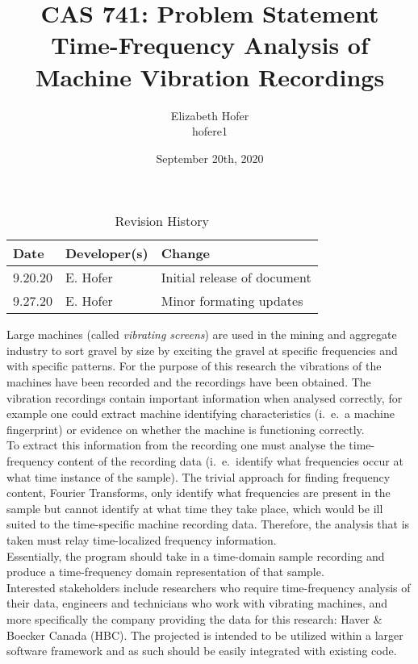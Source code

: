 \documentclass{article}
\title{CAS 741: Problem Statement\\Time-Frequency Analysis of Machine Vibration Recordings}
\author{Elizabeth Hofer \\ hofere1}
\date{September 20th, 2020}
\begin{document}
\maketitle

\begin{table}[hp]
\caption{Revision History} \label{TblRevisionHistory}
\begin{tabularx}{\textwidth}{llX}
\toprule
\textbf{Date} & \textbf{Developer(s)} & \textbf{Change}\\
\midrule
9.20.20 & E. Hofer & Initial release of document\\
9.27.20 & E. Hofer & Minor formating updates\\
\bottomrule
\end{tabularx}
\end{table}


Large machines (called \emph{vibrating screens}) are used in the mining and 
aggregate industry to sort gravel by size by exciting the gravel at specific 
frequencies and with specific patterns. For the purpose of this research the 
vibrations of the machines have been recorded and the recordings have been 
obtained. The vibration recordings contain important information when analysed 
correctly, for example one could extract machine identifying characteristics 
(i.\ e.\ a machine fingerprint) or evidence on whether the machine is 
functioning correctly.\\
  
To extract this information from the recording one must analyse the 
time-frequency content of the recording data (i.\ e.\ identify what frequencies 
occur at what time instance of the sample). The trivial approach for finding 
frequency content, Fourier Transforms, only identify what frequencies are 
present in the sample but cannot identify at what time they take place, which 
would be ill suited to the time-specific machine recording data. Therefore, the 
analysis that is taken must relay time-localized frequency information.\\

Essentially, the program should take in a time-domain sample recording and produce a time-frequency domain representation of that sample.\\

Interested stakeholders include researchers who require time-frequency analysis 
of their data, engineers and technicians who work with vibrating machines, and 
more specifically the company providing the data for this research: Haver \& 
Boecker Canada (HBC). The projected is intended to be utilized within a larger 
software framework and as such should be easily integrated with existing code.\\
\end{document}
